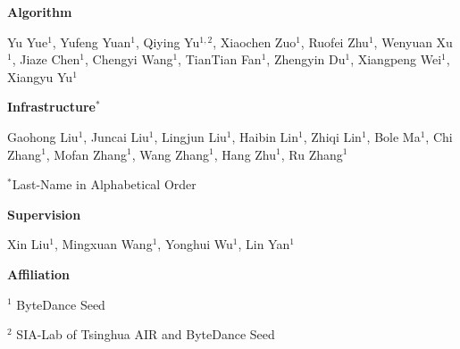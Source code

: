 
\textbf{Algorithm}

Yu Yue$^{1}$, Yufeng Yuan$^{1}$, Qiying Yu$^{1,2}$, Xiaochen Zuo$^{1}$, Ruofei Zhu$^{1}$, Wenyuan Xu$^{1}$, Jiaze Chen$^{1}$, Chengyi Wang$^{1}$, TianTian Fan$^{1}$,  Zhengyin Du$^{1}$, Xiangpeng Wei$^{1}$, Xiangyu Yu$^{1}$


\textbf{Infrastructure$^{*}$}

Gaohong Liu$^{1}$, Juncai Liu$^{1}$, Lingjun Liu$^{1}$, Haibin Lin$^{1}$, Zhiqi Lin$^{1}$, Bole Ma$^{1}$, Chi Zhang$^{1}$, Mofan Zhang$^{1}$, Wang Zhang$^{1}$, Hang Zhu$^{1}$, Ru Zhang$^{1}$

$^{*}$Last-Name in Alphabetical Order



\textbf{Supervision}

Xin Liu$^{1}$, Mingxuan Wang$^{1}$, Yonghui Wu$^{1}$, Lin Yan$^{1}$


\textbf{Affiliation}

$^1$ ByteDance Seed

$^2$ SIA-Lab of Tsinghua AIR and ByteDance Seed